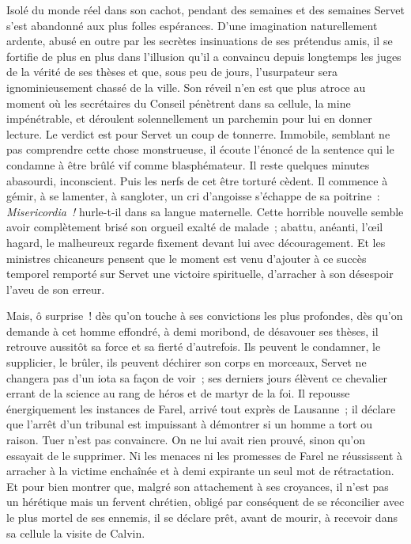 \documentclass[french,twoside]{book} %
\newcommand{\astermono}{\medskip\centerline{\color{rubric}\large\selectfont{\syms ✻}}\medskip\par}%
\newcommand\foreign[1]{\emph{#1}}
\begin{document}
\astermono

\noindent Isolé du monde réel dans son cachot, pendant des semaines et des semaines Servet s’est abandonné aux plus folles espérances. D’une imagination naturellement ardente, abusé en outre par les secrètes insinuations de ses prétendus amis, il se fortifie de plus en plus dans l’illusion qu’il a convaincu depuis longtemps les juges de la vérité de ses thèses et que, sous peu de jours, l’usurpateur sera ignominieusement chassé de la ville. Son réveil n’en est que plus atroce au moment où les secrétaires du Conseil pénètrent dans sa cellule, la mine impénétrable, et déroulent solennellement un parchemin pour lui en donner lecture. Le verdict est pour Servet un coup de tonnerre. Immobile, semblant ne pas comprendre cette chose monstrueuse, il écoute l’énoncé de la sentence qui le condamne à être brûlé vif comme blasphémateur. Il reste quelques minutes abasourdi, inconscient. Puis les nerfs de cet être torturé cèdent. Il commence à gémir, à se lamenter, à sangloter, un cri d’angoisse s’échappe de sa poitrine : \foreign{Misericordia !} hurle-t-il dans sa langue maternelle. Cette horrible nouvelle semble avoir complètement brisé son orgueil exalté de malade ; abattu, anéanti, l’œil hagard, le malheureux regarde fixement devant lui avec découragement. Et les ministres chicaneurs pensent que le moment est venu d’ajouter à ce succès temporel remporté sur Servet une victoire spirituelle, d’arracher à son désespoir l’aveu de son erreur.\par
Mais, ô surprise ! dès qu’on touche à ses convictions les plus profondes, dès qu’on demande à cet homme effondré, à demi moribond, de désavouer ses thèses, il retrouve aussitôt sa force et sa fierté d’autrefois. Ils peuvent le condamner, le supplicier, le brûler, ils peuvent déchirer son corps en morceaux, Servet ne changera pas d’un iota sa façon de voir ; ses derniers jours élèvent ce chevalier errant de la science au rang de héros et de martyr de la foi. Il repousse énergiquement les instances de Farel, arrivé tout exprès de Lausanne ; il déclare que l’arrêt d’un tribunal est impuissant à démontrer si un homme a tort ou raison. Tuer n’est pas convaincre. On ne lui avait rien prouvé, sinon qu’on essayait de le supprimer. Ni les menaces ni les promesses de Farel ne réussissent à arracher à la victime enchaînée et à demi expirante un seul mot de rétractation. Et pour bien montrer que, malgré son attachement à ses croyances, il n’est pas un hérétique mais un fervent chrétien, obligé par conséquent de se réconcilier avec le plus mortel de ses ennemis, il se déclare prêt, avant de mourir, à recevoir dans sa cellule la visite de Calvin.\par
\end{document}
